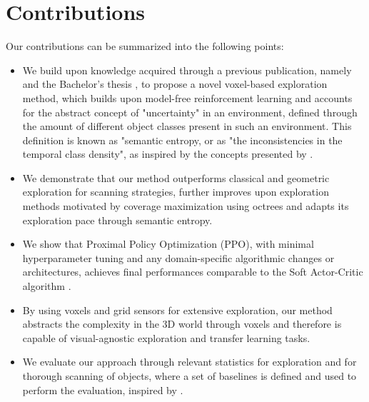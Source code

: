 \section{Contributions}\label{chap:1:contributions}
Our contributions can be summarized into the following points:
\begin{itemize}
    \item We build upon knowledge acquired through a previous publication, namely \textit{}\cite{DBLP:journals/corr/abs-2105-09843}
    and the Bachelor's thesis \textit{}
    , to propose a novel voxel-based exploration method, which builds upon model-free
    reinforcement learning
    and accounts for the abstract concept of "uncertainty" in an environment, defined through the amount of different object classes present in such an environment. This definition is known as "semantic entropy, or as "the inconsistencies in the temporal class density", as inspired by the concepts presented by \textcite{chaplot2020semantic}.
    
    \item We demonstrate that our method outperforms classical and geometric exploration for scanning strategies, further improves upon exploration methods motivated by coverage maximization \cite{chen2019learning} using octrees and adapts its exploration pace through semantic entropy.
    
    \item We show that Proximal Policy Optimization (PPO), with minimal hyperparameter tuning and any domain-specific algorithmic changes or architectures, achieves final performances comparable to the Soft Actor-Critic algorithm \cite{schulman2017proximal}.
    \item By using voxels and grid sensors for extensive exploration, our method abstracts the complexity in the 3D world through voxels and therefore is capable of visual-agnostic exploration and transfer learning tasks. 
    
    \item We evaluate our approach through relevant statistics for exploration and for thorough scanning of objects, where a set of baselines is defined and used to perform the evaluation, inspired by \textcite{darpa_subterranean_challenge}.
    

\end{itemize}

